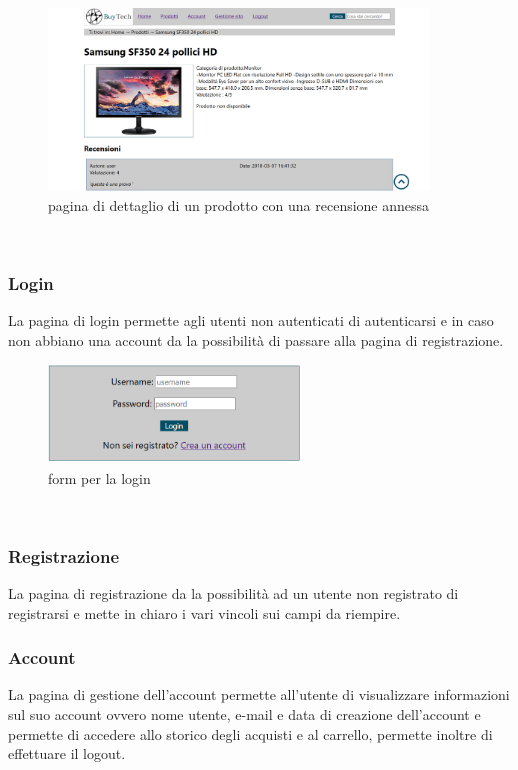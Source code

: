 \begin{figure}[h!]
	\label{dettaglio} 
	\centering 
	\includegraphics[width=0.9\textwidth]{immagini/dettaglio.png}
	\caption{pagina di dettaglio di un prodotto con una recensione annessa} 
\end{figure}
\mbox{} \\

\subsubsection{Login}
La pagina di login permette agli utenti non autenticati di autenticarsi e in caso non abbiano una account da la possibilità di passare alla pagina di registrazione.

\begin{figure}[h!]
	\label{login} 
	\centering 
	\includegraphics[width=0.6\textwidth]{immagini/login.png}
	\caption{form per la login} 
\end{figure}
\mbox{} \\

\subsubsection{Registrazione}
La pagina di registrazione da la possibilità ad un utente non registrato di registrarsi e mette in chiaro i vari vincoli sui campi da riempire.

\subsubsection{Account}
La pagina di gestione dell'account permette all'utente di visualizzare informazioni sul suo account ovvero nome utente, e-mail e data di creazione dell'account e permette di accedere allo storico degli acquisti e al carrello, permette inoltre di effettuare il logout.


